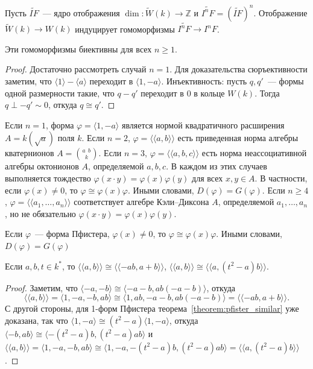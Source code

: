 \documentclass[a4paper,oneside,12pt]{article}
\theoremstyle{plain} { \swapnumbers
\newtheorem{theorem}{Теорема}[subsection]
\newtheorem{corollary}[theorem]{Следствие}
\newtheorem{lemma}[theorem]{Лемма}
\newtheorem{proposition}[theorem]{Утверждение}
\newtheorem{claim}[theorem]{Факт}
}
\theoremstyle{definition} { \swapnumbers
\newtheorem{definition}[theorem]{Определение}
\newtheorem{notation}[theorem]{Обозначение}
\newtheorem{remark}[theorem]{Замечание}
\newtheorem{remarks}[theorem]{Замечания}
\newtheorem{example}[theorem]{Пример}
\newtheorem{examples}[theorem]{Примеры}
\newtheorem{sssection}[theorem]{}
}
\def\tilde{\widetilde}
\def\ph{\varphi}
\def\la{\langle}
\def\ra{\rangle}
\def\lla{\la\!\la}
\def\rra{\ra\!\ra}
\def\quaternion#1#2#3{\binom{{#1}\:\:{#2}}{#3}}
\begin{document}
Пусть $\tilde{IF}$~--- ядро отображения $\dim\colon\tilde W(k)\to\mathbb Z$ и $\tilde{I^nF}=(\tilde{IF})^n$.
Отображение $\tilde W(k)\to W(k)$ индуцирует гомоморфизмы $\tilde{I^nF}\to I^nF$.
\begin{lemma}
Эти гомоморфизмы биективны для всех $n\geq 1$.
\end{lemma}
\begin{proof}
Достаточно рассмотреть случай $n=1$. Для доказательства сюръективности заметим, что $\la 1\ra-\la a\ra$
переходит в $\la 1,-a\ra$. Инъективность: пусть $q,q'$~--- формы одной размерности такие, что $q-q'$
переходит в 0 в кольце $W(k)$. Тогда $q\perp -q'\sim 0$, откуда $q\cong q'$.
\end{proof}

Если $n=1$, форма $\ph=\la 1,-a\ra$ является нормой квадратичного расширения $A=k(\sqrt{a})$ поля $k$.
Если $n=2$, $\ph=\lla a,b\rra$ есть приведенная норма алгебры кватернионов $A=\quaternion{a}{b}{k}$.
Если $n=3$, $\ph=\lla a,b,c\rra$ есть норма неассоциативной алгебры октонионов $A$, определяемой $a,b,c$.
В каждом из этих случаев выполняется тождество $\ph(x\cdot y)=\ph(x)\ph(y)$ для всех $x,y\in A$.
В частности, если $\ph(x)\neq 0$, то $\ph\cong\ph(x)\ph$. Иными словами, $D(\ph)=G(\ph)$.
Если $n\geq 4$, $\ph=\lla a_1,\dots,a_n\rra$ соответствует алгебре Кэли--Диксона $A$, определяемой
$a_1,\dots,a_n$, но не обязательно $\ph(x\cdot y)=\ph(x)\ph(y)$.

\begin{theorem}[Пфистер]\label{theorem:pfister_similar}
Если $\ph$~--- форма Пфистера, $\ph(x)\neq 0$, то $\ph\cong\ph(x)\ph$. Иными словами, $D(\ph)=G(\ph)$
\end{theorem}

\begin{lemma}\label{lemma:pfister_equiv}
Если $a,b,t\in k^*$, то $\lla a,b\rra\cong\lla -ab,a+b\rra$, $\lla a,b\rra\cong\lla a,(t^2-a)b\rra$.
\end{lemma}
\begin{proof}
Заметим, что $\la -a,-b\ra\cong\la -a-b,ab(-a-b)\ra$, откуда
$$
\lla a,b\rra=\la 1,-a,-b,ab\ra\cong\la 1,ab,-a-b,ab(-a-b)\ra=\lla -ab,a+b\rra.
$$
С другой стороны, для 1-форм Пфистера теорема~\ref{theorem:pfister_similar} уже доказана, так что
$\la 1,-a\ra\cong(t^2-a)\la 1,-a\ra$, откуда $\la -b,ab\ra\cong\la -(t^2-a)b,(t^2-a)ab\ra$
и $\lla a,b\rra=\la 1,-a,-b,ab\ra\cong\la 1,-a,-(t^2-a)b,(t^2-a)ab\ra=\lla a,(t^2-a)b\rra$.
\end{proof}
\end{document}
